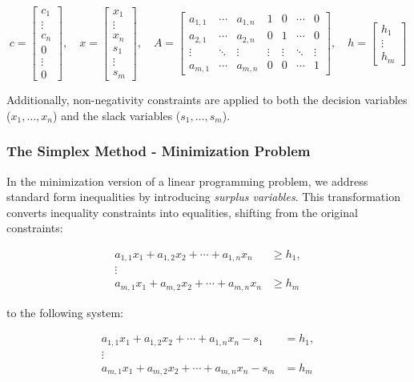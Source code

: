 \documentclass[unicode,11pt,a4paper,oneside,numbers=endperiod,openany]{scrartcl}
\begin{document}
\[
c = \begin{bmatrix}
c_1 \\ \vdots \\ c_n \\ 0 \\ \vdots \\ 0
\end{bmatrix},
\quad
x = \begin{bmatrix}
x_1 \\ \vdots \\ x_n \\ s_1 \\ \vdots \\ s_m
\end{bmatrix},
\quad
A = \begin{bmatrix}
a_{1,1} & \cdots & a_{1,n} & 1 & 0 & \cdots & 0 \\
a_{2,1} & \cdots & a_{2,n} & 0 & 1 & \cdots & 0 \\
\vdots & \ddots & \vdots & \vdots & \vdots & \ddots & \vdots \\
a_{m,1} & \cdots & a_{m,n} & 0 & 0 & \cdots & 1
\end{bmatrix},
\quad
h = \begin{bmatrix}
h_1 \\ \vdots \\ h_m
\end{bmatrix}
\]

Additionally, non-negativity constraints are applied to both the decision variables (\(x_1, \ldots, x_n\)) and the slack variables (\(s_1, \ldots, s_m\)).

\subsubsection{The Simplex Method - Minimization Problem}
In the minimization version of a linear programming problem, we address standard form inequalities by introducing \textit{surplus variables}. This transformation converts inequality constraints into equalities, shifting from the original constraints:

\[
\begin{aligned}
a_{1,1}x_1 + a_{1,2}x_2 + \cdots + a_{1,n}x_n &\geq h_1, \\
\vdots \\
a_{m,1}x_1 + a_{m,2}x_2 + \cdots + a_{m,n}x_n &\geq h_m
\end{aligned}
\]

to the following system:

\[
\begin{aligned}
a_{1,1}x_1 + a_{1,2}x_2 + \cdots + a_{1,n}x_n - s_1 &= h_1, \\
\vdots \\
a_{m,1}x_1 + a_{m,2}x_2 + \cdots + a_{m,n}x_n - s_m &= h_m
\end{aligned}
\]
\end{document}
